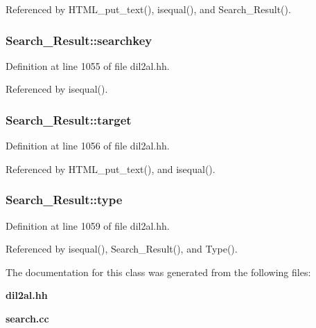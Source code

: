 Referenced by HTML\_\-put\_\-text(), isequal(), and Search\_\-Result().
\subsubsection{ Search\_\-Result::searchkey\hspace{0.3cm}{\tt  [protected]}}\label{classSearch__Result_n0}




Definition at line 1055 of file dil2al.hh.

Referenced by isequal().
\subsubsection{ Search\_\-Result::target\hspace{0.3cm}{\tt  [protected]}}\label{classSearch__Result_n1}




Definition at line 1056 of file dil2al.hh.

Referenced by HTML\_\-put\_\-text(), and isequal().
\subsubsection{ Search\_\-Result::type\hspace{0.3cm}{\tt  [protected]}}\label{classSearch__Result_n6}




Definition at line 1059 of file dil2al.hh.

Referenced by isequal(), Search\_\-Result(), and Type().

The documentation for this class was generated from the following files:\begin{CompactItemize}
\item 
{\bf dil2al.hh}\item 
{\bf search.cc}\end{CompactItemize}
